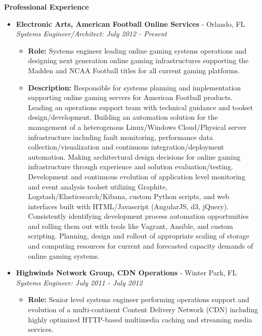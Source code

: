\documentclass[10pt,oneside]{article}
\newenvironment{ressection}[1]{
  \vspace{4pt}
  \textbf{\selectfont\normalsize#1}
  \begin{itemize}
  \vspace{3pt}
}{
  \end{itemize}
}
\newcommand{\ressubitem}[1]{
  \vspace{-1pt}
  \item \begin{flushleft} #1 \end{flushleft}
}
\newcommand{\resbigitem}[3]{
  \vspace{-5pt}
  \item
  \textbf{#1} - #2 \\
  \textit{#3}
}
\newenvironment{ressubsec}[3]{
  \resbigitem{#1}{#2}{#3}
  \vspace{-2pt}
  \begin{itemize}
}{
  \end{itemize}
}
\begin{document}

\begin{ressection}{Professional Experience}

  \begin{ressubsec}{Electronic Arts, American Football Online Services}{Orlando, FL}{Systems Engineer/Architect: July 2012 - Present}

    \ressubitem{\textbf{Role:} Systems engineer leading online gaming systems operations and designing next generation online gaming infrastructures supporting the Madden and NCAA Football titles for all current gaming platforms.}

    \ressubitem{\textbf{Description:} Responsible for systems planning and implementation supporting online gaming servers for American Football products. Leading an operations support team with technical guidance and toolset design/development. Building an automation solution for the management of a heterogenous Linux/Windows Cloud/Physical server infrastructure including fault monitoring, performance data collection/visualization and continuous integration/deployment automation. Making architectural design decisions for online gaming infrastructure through experience and solution evaluation/testing. Development and continuous evolution of application level monitoring and event analysis toolset utilizing Graphite, Logstash/Elasticsearch/Kibana, custom Python scripts, and web interfaces built with HTML/Javascript (AngularJS, d3, jQuery). Consistently identifying development process automation opportunities and rolling them out with tools like Vagrant, Ansible, and custom scripting. Planning, design and rollout of appropriate scaling of storage and computing resources for current and forecasted capacity demands of online gaming systems.}

  \end{ressubsec}
  
  \begin{ressubsec}{Highwinds Network Group, CDN Operations}{Winter Park, FL}{Systems Engineer: July 2011 - July 2012}

    \ressubitem{\textbf{Role:} Senior level systems engineer performing operations support and evolution of a multi-continent Content Delivery Network (CDN) including highly optimized HTTP-based multimedia caching and streaming media services.}


\end{ressubsec}
\end{ressection}
\end{document}
